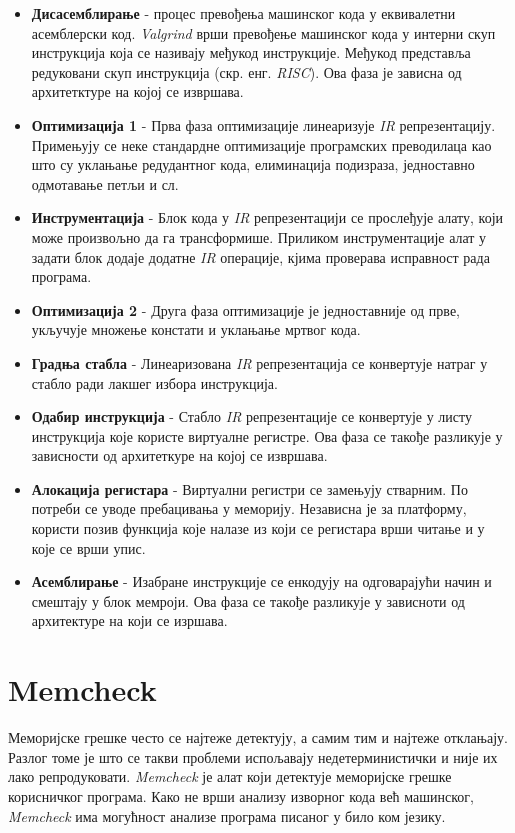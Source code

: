 \documentclass[12pt,oneside]{memoir}
\begin{document}
\begin{itemize}
  \item \textbf{ Дисасемблирање } - процес превођења машинског кода у еквивалетни асемблерски код. \textit{Valgrind} врши превођење машинског кода у интерни скуп инструкција која се називају међукод инструкције. Међукод представља редуковани скуп инструкција (скр. енг. \textit{RISC}). Ова фаза је зависна од архитетктуре на којој се извршава.
  \item \textbf{ Оптимизација 1} - Прва фаза оптимизације линеаризује \textit{IR} репрезентацију. Примењују се неке стандардне оптимизације програмских преводилаца као што су уклањање редудантног кода, елиминација подизраза, једноставно одмотавање петљи и сл.
  \item \textbf{ Инструментација} - Блок кода у \textit{IR} репрезентацији се прослеђује алату, који може произвољно да га трансформише. Приликом инструментације алат у задати блок додаје додатне \textit{IR} операције, кјима проверава исправност рада програма.
  \item \textbf{ Оптимизација 2 } - Друга фаза оптимизације је једноставније од прве, укључује множење констати и уклањање мртвог кода.
  \item \textbf{ Градња стабла } - Линеаризована \textit{IR} репрезентација се конвертује натраг у стабло ради лакшег избора инструкција.
  \item \textbf{ Одабир инструкција } - Стабло \textit{IR} репрезентације се конвертује у листу инструкција које користе виртуалне регистре. Ова фаза се такође разликује у зависности од архитеткуре на којој се извршава. 
  \item \textbf{ Алокација регистара} - Виртуални регистри се замењују стварним. По потреби се уводе пребацивања у меморију. Независна је за платформу, користи позив функција које налазе из који се регистара врши читање и у које се врши упис.
  \item \textbf{ Асемблирање } - Изабране инструкције се енкодују на одговарајући начин и смештају у блок мемроји. Ова фаза се такође разликује у зависноти од архитектуре на који се изршава. ~\cite{SeeMIPSRun}
\end{itemize}

\section{Memcheck}

\indent Меморијске грешке често се најтеже детектују, а самим тим и најтеже отклањају. Разлог томе је што се такви проблеми испољавају недетерминистички и није их лако репродуковати. \textit{Memcheck} је алат који детектује меморијске грешке корисничког програма. Како не врши анализу изворног кода већ машинског, \textit{Memcheck} има могућност анализе програма писаног у било ком језику.
\end{document}
